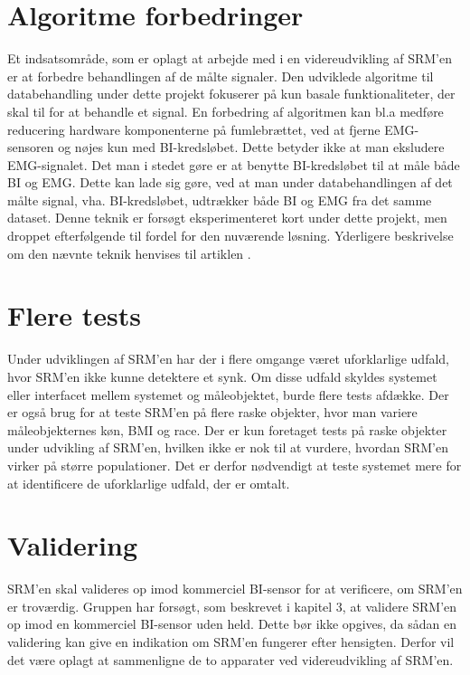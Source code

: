  
\section{Algoritme forbedringer}

Et indsatsområde, som er oplagt at arbejde med i en videreudvikling af SRM'en er at forbedre behandlingen af de målte signaler. Den udviklede algoritme til databehandling under dette projekt fokuserer på kun basale funktionaliteter, der skal til for at behandle et signal. En forbedring af algoritmen kan bl.a medføre reducering hardware komponenterne på fumlebrættet, ved at fjerne EMG-sensoren og nøjes kun med BI-kredsløbet. Dette betyder ikke at man eksludere EMG-signalet. Det man i stedet gøre er at benytte BI-kredsløbet til at måle både BI og EMG. Dette kan lade sig gøre, ved at man under databehandlingen af det målte signal, vha. BI-kredsløbet, udtrækker både BI og EMG  fra det samme dataset. Denne teknik er forsøgt eksperimenteret kort under dette projekt, men droppet efterfølgende til fordel for den nuværende løsning. Yderligere beskrivelse om den nævnte teknik henvises til artiklen  \cite{Nahrstaedt2012}.      

\section{Flere tests}
Under udviklingen af  SRM'en har der i flere omgange været uforklarlige udfald, hvor SRM'en ikke kunne detektere et synk. Om disse udfald skyldes systemet eller interfacet mellem systemet og måleobjektet, burde flere tests afdække. Der er også brug for at teste SRM'en på flere raske objekter, hvor man variere måleobjekternes køn, BMI og race. Der er kun foretaget tests på raske objekter under udvikling af SRM'en, hvilken ikke er nok til at vurdere, hvordan SRM'en virker på større populationer. Det er derfor nødvendigt at teste systemet mere for at identificere de uforklarlige udfald, der er omtalt.
 
 
\section{Validering}

SRM'en skal valideres op imod kommerciel BI-sensor for at verificere, om SRM'en er troværdig. Gruppen har forsøgt, som beskrevet i kapitel 3, at validere SRM'en op imod en kommerciel BI-sensor uden held. Dette bør ikke opgives, da sådan en validering kan give en indikation om SRM'en fungerer efter hensigten. Derfor vil det være oplagt at sammenligne de to apparater ved videreudvikling af SRM'en. 

